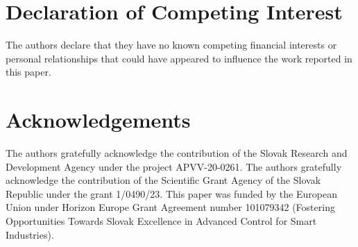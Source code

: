 \documentclass[preprint,12pt,authoryear]{elsarticle}
\begin{document}
\section*{Declaration of Competing Interest}
The authors declare that they have no known competing financial interests or personal relationships that could have appeared to influence the work reported in this paper.

\section*{Acknowledgements}
The authors gratefully acknowledge the contribution of the Slovak Research and Development Agency under the project APVV-20-0261. The authors gratefully acknowledge the contribution of the Scientific Grant Agency of the Slovak Republic under the grant 1/0490/23. This paper was funded by the European Union under Horizon Europe Grant Agreement number 101079342 (Fostering Opportunities Towards Slovak Excellence in Advanced Control for Smart Industries).



\end{document}
